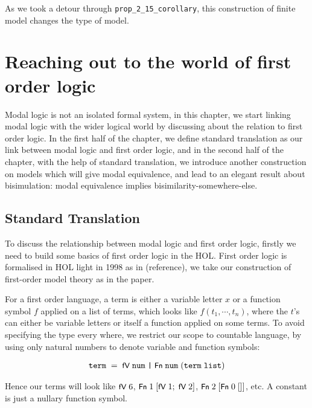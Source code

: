 \documentclass[letterpaper]{article}
\renewcommand{\HOLConst}[1]{{\textsf{\upshape\small #1}}}
\renewcommand{\HOLinline}[1]{\ensuremath{#1}}
\newenvironment{holmath}{\begin{displaymath}\begin{array}{l}}{\end{array}\end{displaymath}\ignorespacesafterend}
\begin{document}
As we took a detour through \texttt{prop_2_15_corollary}, this construction of finite model changes the type of model. 


\section{Reaching out to the world of first order logic}

Modal logic is not an isolated formal system, in this chapter, we start linking modal logic with the wider logical world by discussing about the relation to first order logic. In the first half of the chapter, we define standard translation as our link between modal logic and first order logic, and in the second half of the chapter, with the help of standard translation, we introduce another construction on models which will give modal equivalence, and lead to an elegant result about bisimulation: modal equivalence implies bisimilarity-somewhere-else.

\subsection{Standard Translation}

To discuss the relationship between modal logic and first order logic, firstly we need to build some basics of first order logic in the HOL. First order logic is formalised in HOL light in 1998 as in (reference), we take our construction of first-order model theory as in the paper.

For a first order language, a term is either a variable letter $x$ or a function symbol $f$ applied on a list of terms, which looks like $f(t_1,\cdots,t_n)$, where the $t$'s can either be variable letters or itself a function applied on some terms. To avoid specifying the type every where, we restrict our scope to countable language, by using only natural numbers to denote variable and function symbols:

\begin{holmath}
  \HOLTyOp{term}\;=\;\HOLConst{fV}\;\HOLTyOp{num}\;\HOLTokenBar{}\;\HOLConst{Fn}\;\HOLTyOp{num}\;(\HOLTyOp{term}\;\HOLTyOp{list})
\end{holmath}

Hence our terms will look like \HOLinline{\HOLConst{fV}\;\HOLNumLit{6}}, \HOLinline{\HOLConst{Fn}\;\HOLNumLit{1}\;[\HOLConst{fV}\;\HOLNumLit{1};\;\HOLConst{fV}\;\HOLNumLit{2}]}, \HOLinline{\HOLConst{Fn}\;\HOLNumLit{2}\;[\HOLConst{Fn}\;\HOLNumLit{0}\;[]]}, etc. A constant is just a nullary function symbol.
\end{document}
